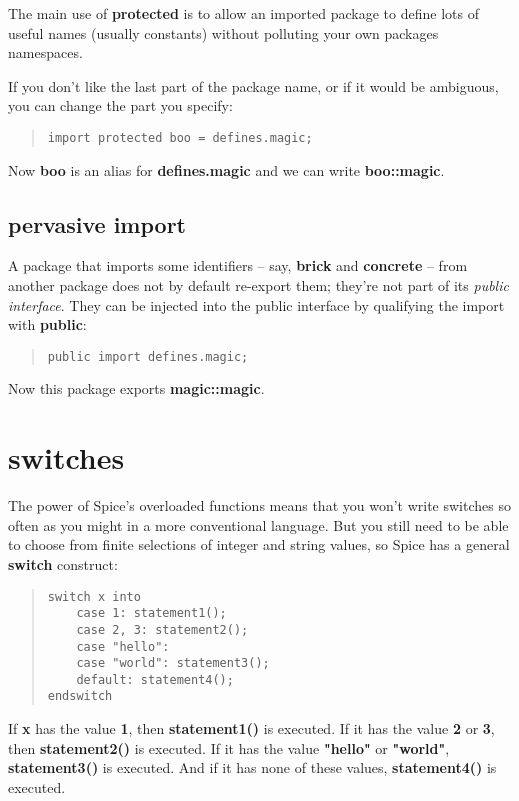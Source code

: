 \documentclass{report}
\begin{document}
The main use of {\bf protected} is to allow an imported package to define lots of
useful names (usually constants) without polluting your own packages
namespaces.

If you don't like the last part of the package name, or if it would be
ambiguous, you can change the part you specify:

\begin{quote}
\begin{verbatim}
import protected boo = defines.magic;
\end{verbatim}
\end{quote}
Now {\bf boo} is an alias for {\bf defines.magic} and we can write {\bf boo::magic}.\section{pervasive import}


A package that imports some identifiers -- say, {\bf brick} and {\bf concrete} -- from
another package does not by default re-export them; they're not part of its
{\em public interface}. They can be injected into the public interface by
qualifying the import with {\bf public}:

\begin{quote}
\begin{verbatim}
public import defines.magic;
\end{verbatim}
\end{quote}
Now this package exports {\bf magic::magic}.\chapter{switches}


The power of Spice's overloaded functions means that you won't write switches
so often as you might in a more conventional language. But you still need to
be able to choose from finite selections of integer and string values, so
Spice has a general {\bf switch} construct:

\begin{quote}
\begin{verbatim}
switch x into
    case 1: statement1();
    case 2, 3: statement2();
    case "hello":
    case "world": statement3();
    default: statement4();
endswitch
\end{verbatim}
\end{quote}
If {\bf x} has the value {\bf 1}, then {\bf statement1()} is executed. If it has the value
{\bf 2} or {\bf 3}, then {\bf statement2()} is executed. If it has the value {\bf "hello"} or
{\bf "world"}, {\bf statement3()} is executed. And if it has none of these values,
{\bf statement4()} is executed.
\end{document}
